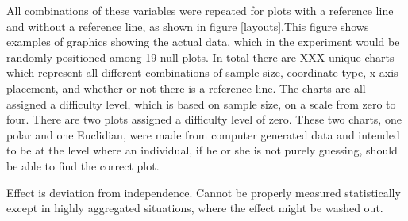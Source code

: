  All combinations of these variables were repeated for plots with a reference line and without a reference line, as shown in figure \ref{layouts}.This figure shows examples of graphics showing the actual data, which in the experiment would be randomly positioned among 19 null plots. In total there are XXX unique charts which represent all different combinations of sample size, coordinate type, x-axis placement, and whether or not there is a reference line. The charts are all assigned a difficulty level, which is based on sample size, on a scale from zero to four. There are two plots assigned a difficulty level of zero. These two charts, one polar and one Euclidian, were made from computer generated data and intended to be at the level where an individual, if he or she is not purely guessing, should be able to find the correct plot. 



Effect is deviation from independence. Cannot be properly measured statistically except in highly aggregated situations, where the effect might be washed out.




